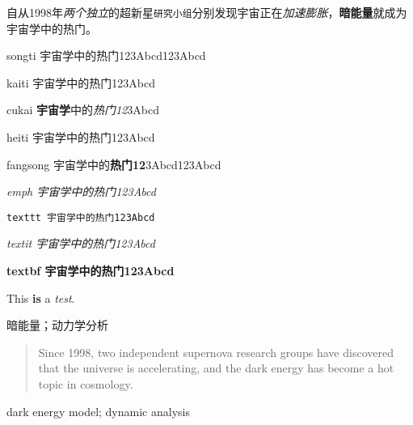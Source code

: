 

\begin{zhaiyao}
{
{

{\songti 自从}1998年\emph{两个独立}的超新星\texttt{研究小组}分别发现宇宙正在\textit{加速膨胀}，\textbf{暗能量}就成为{\fangsong 宇宙学中的热门}。

{\songti songti 宇宙学中的热门123Abcd123Abcd}


{\kaiti kaiti 宇宙学中的热门123Abcd}

{\cukai cukai \textbf{宇宙学}中的\textit{热门12}3Abcd}

{\heiti heiti 宇宙学中的热门}{123Abcd}

{\fangsong fangsong 宇宙学中的\textbf{热门12}3Abcd123Abcd}

{\emph{emph 宇宙学中的热门123Abcd}}

{\texttt{texttt 宇宙学中的热门1{23Abcd}}}

{\textit{textit 宇宙学中的热门123Abcd}}

{\textbf{textbf 宇宙学中的热门123Abcd}}


This \textbf{is} a \textit{test}.
}
}
\end{zhaiyao}




\begin{guanjianci}
暗能量；动力学分析
\end{guanjianci}



\begin{abstract}
Since 1998, two independent supernova research groups have discovered that the universe is accelerating, and the dark energy has become a hot topic in cosmology. 

\end{abstract}



\begin{keywords}
dark energy model; dynamic analysis
\end{keywords} 